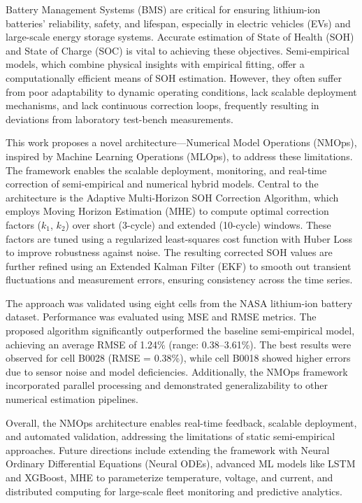 Battery Management Systems (BMS) are critical for ensuring lithium-ion batteries' reliability, safety, and lifespan, especially in electric vehicles (EVs) and large-scale energy storage systems. Accurate estimation of State of Health (SOH) and State of Charge (SOC) is vital to achieving these objectives. Semi-empirical models, which combine physical insights with empirical fitting, offer a computationally efficient means of SOH estimation. However, they often suffer from poor adaptability to dynamic operating conditions, lack scalable deployment mechanisms, and lack continuous correction loops, frequently resulting in deviations from laboratory test-bench measurements.

This work proposes a novel architecture—Numerical Model Operations (NMOps), inspired by Machine Learning Operations (MLOps), to address these limitations. The framework enables the scalable deployment, monitoring, and real-time correction of semi-empirical and numerical hybrid models. Central to the architecture is the Adaptive Multi-Horizon SOH Correction Algorithm, which employs Moving Horizon Estimation (MHE) to compute optimal correction factors ($k_1$, $k_2$) over short (3-cycle) and extended (10-cycle) windows. These factors are tuned using a regularized least-squares cost function with Huber Loss to improve robustness against noise. The resulting corrected SOH values are further refined using an Extended Kalman Filter (EKF) to smooth out transient fluctuations and measurement errors, ensuring consistency across the time series.

The approach was validated using eight cells from the NASA lithium-ion battery dataset. Performance was evaluated using MSE and RMSE metrics. The proposed algorithm significantly outperformed the baseline semi-empirical model, achieving an average RMSE of 1.24\% (range: 0.38–3.61\%). The best results were observed for cell B0028 (RMSE = 0.38\%), while cell B0018 showed higher errors due to sensor noise and model deficiencies. Additionally, the NMOps framework incorporated parallel processing and demonstrated generalizability to other numerical estimation pipelines.

Overall, the NMOps architecture enables real-time feedback, scalable deployment, and automated validation, addressing the limitations of static semi-empirical approaches. Future directions include extending the framework with Neural Ordinary Differential Equations (Neural ODEs), advanced ML models like LSTM and XGBoost, MHE to parameterize temperature, voltage, and current, and distributed computing for large-scale fleet monitoring and predictive analytics.

